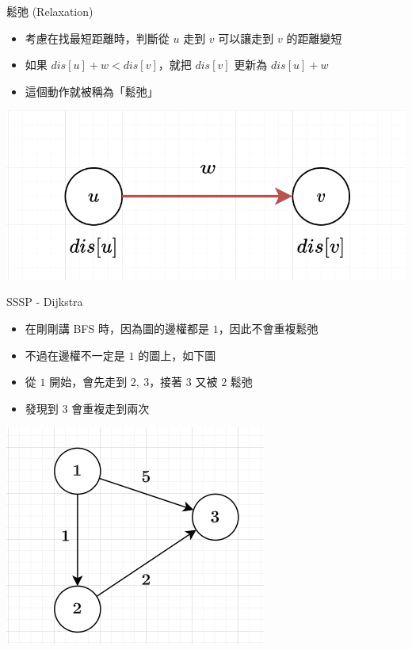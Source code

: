 \documentclass[aspectratio=169]{beamer}
\begin{document}
    \begin{frame}{鬆弛 (Relaxation)}
        \begin{itemize}
            \item 考慮在找最短距離時，判斷從 $u$ 走到 $v$ 可以讓走到 $v$ 的距離變短
            \item 如果 $dis[u] + w < dis[v]$，就把 $dis[v]$ 更新為 $dis[u] + w$
            \item 這個動作就被稱為「鬆弛」
        \end{itemize}
        \vspace{3mm}
        \begin{center}
            \includegraphics[scale=0.3]{images/relaxation.png}
        \end{center}
    \end{frame}
    
    \begin{frame}{SSSP - Dijkstra}
        \begin{itemize}
            \item 在剛剛講 BFS 時，因為圖的邊權都是 $1$，因此不會重複鬆弛
            \item 不過在邊權不一定是 $1$ 的圖上，如下圖
            \item 從 $1$ 開始，會先走到 $2, \ 3$，接著 $3$ 又被 $2$ 鬆弛
            \item 發現到 $3$ 會重複走到兩次
        \end{itemize}
        \vspace{2mm}
        \begin{center}
            \includegraphics[scale=0.5]{images/example_dijkstra.png}
        \end{center}
    \end{frame}
    
\end{document}
